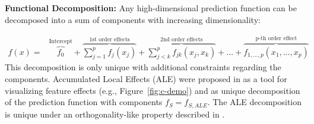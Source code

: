 \documentclass[runningheads]{llncs}\usepackage[]{graphicx}\usepackage[]{color}
\newcommand{\falej}{f_{j,ALE}}                                        %
\begin{document}
\textbf{Functional Decomposition:}
\label{sec:decomposition}
Any high-dimensional prediction function can be decomposed into a sum of components with increasing dimensionality:

\begin{eqnarray}\label{eqn:decomp} f(x)  = &\overbrace{f_0}^\text{Intercept} + \overbrace{\sum_{j=1}^p f_j(x_j)}^\text{1st order effects} + \overbrace{\sum_{j<k}^p f_{jk}(x_j, x_k)}^\text{2nd order effects} + \ldots + \overbrace{f_{1,\ldots,p}(x_1, \ldots, x_p)}^\text{p-th order effect}
\end{eqnarray}
This decomposition is only unique with additional constraints regarding the components.
Accumulated Local Effects (ALE) were proposed in \cite{apley2016visualizing} as a tool for visualizing feature effects (e.g., Figure~\ref{fig:c-demo}) and as unique decomposition of the prediction function with components $f_S = f_{S,ALE}$.
The ALE decomposition is unique under an orthogonality-like property described in \citep{apley2016visualizing}.

\end{document}
